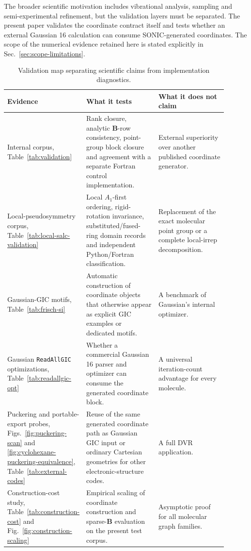 \documentclass[journal=jctcce,manuscript=article,layout=traditional]{achemso}
\newcommand{\SONIC}{SONIC}
\newcommand{\Bmat}{\mathbf{B}}
\theoremstyle{definition}
\begin{document}
The broader scientific motivation includes vibrational analysis, sampling and
semi-experimental refinement, but the validation layers must be separated.  The
present paper validates the coordinate contract itself and tests whether an
external Gaussian 16 calculation can consume \SONIC{}-generated coordinates.
The scope of the numerical evidence retained here is stated explicitly in
Sec.~\ref{sec:scope-limitations}.

\begin{table}[htbp]
\centering
\scriptsize
\setlength{\tabcolsep}{3pt}
\renewcommand{\arraystretch}{0.95}
\caption{Validation map separating scientific claims from implementation
diagnostics.}
\label{tab:validation-map}
\begin{tabular}{@{}p{0.23\linewidth}p{0.34\linewidth}p{0.33\linewidth}@{}}
\toprule
Evidence & What it tests & What it does not claim \\
\midrule
Internal corpus, Table~\ref{tab:validation} & Rank closure, analytic
\(\Bmat\)-row consistency, point-group block closure and agreement with a
separate Fortran control implementation. & External superiority over another
published coordinate generator. \\
\midrule
Local-pseudosymmetry corpus, Table~\ref{tab:local-salc-validation} & Local
\(A_1\)-first ordering, rigid-rotation invariance, substituted/fused-ring domain
records and independent Python/Fortran classification. & Replacement of the
exact molecular point group or a complete local-irrep decomposition. \\
\midrule
Gaussian-GIC motifs, Table~\ref{tab:frisch-si} & Automatic construction of
coordinate objects that otherwise appear as explicit GIC examples or dedicated
motifs. & A benchmark of Gaussian's internal optimizer. \\
\midrule
Gaussian \texttt{ReadAllGIC} optimizations, Table~\ref{tab:readallgic-opt} &
Whether a commercial Gaussian 16 parser and optimizer can consume the generated
coordinate block. & A universal iteration-count advantage for every molecule. \\
\midrule
Puckering and portable-export probes, Figs.~\ref{fig:puckering-scan} and
\ref{fig:cyclohexane-puckering-equivalence}, Table~\ref{tab:external-codes} & Reuse of
the same generated coordinate path as Gaussian GIC input or ordinary Cartesian
geometries for other electronic-structure codes. & A full DVR application. \\
\midrule
Construction-cost study, Table~\ref{tab:construction-cost} and
Fig.~\ref{fig:construction-scaling} & Empirical scaling of coordinate
construction and sparse-\(\Bmat\) evaluation on the present test corpus. &
Asymptotic proof for all molecular graph families. \\
\bottomrule
\end{tabular}
\end{table}
\end{document}

